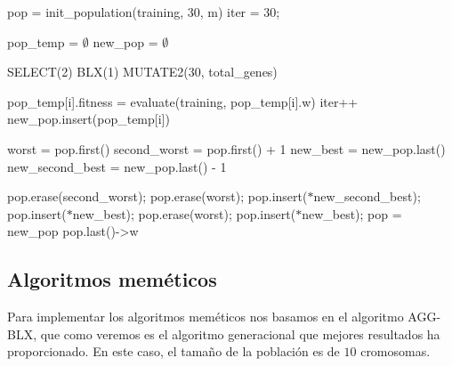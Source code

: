 \documentclass[12pt]{article}
\begin{document}
\begin{algorithm}[h]
\begin{algorithmic}

    \State pop = init\_population(training, 30, m) 
    \State iter = 30;

        \State pop\_temp = $\emptyset$  
        \State new\_pop = $\emptyset$   

        \State SELECT(2) 
        \State BLX(1)  
        \State MUTATE2(30, total\_genes)

          
            \State pop\_temp[i].fitness = evaluate(training, pop\_temp[i].w)
            \State iter++
            \State new\_pop.insert(pop\_temp[i])
        \EndFor
        
        \State worst = pop.first()
        \State second\_worst = pop.first() + 1
        \State new\_best = new\_pop.last()
        \State new\_second\_best = new\_pop.last() - 1

         
          \State pop.erase(second\_worst);
          \State pop.erase(worst);
          \State pop.insert($\ast$new\_second\_best);
          \State pop.insert($\ast$new\_best);
         
          \State pop.erase(worst);
          \State pop.insert($\ast$new\_best);
        \EndIf
        \State pop = new\_pop 
    \EndWhile
    \State \Return pop.last()->w
\EndFunction
  
\end{algorithmic}
\end{algorithm}

\subsection*{Algoritmos meméticos}
\label{am}

Para implementar los algoritmos meméticos nos basamos en el algoritmo AGG-BLX, que como veremos es el algoritmo generacional que mejores resultados ha proporcionado. En este caso, el tamaño de la población es de $10$ cromosomas.\\
\end{document}
